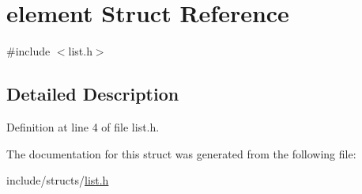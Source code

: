 \hypertarget{structelement}{\section{element \-Struct \-Reference}
\label{structelement}
}


{\ttfamily \#include $<$list.\-h$>$}



\subsection{\-Detailed \-Description}


\-Definition at line 4 of file list.\-h.



\-The documentation for this struct was generated from the following file\-:\begin{DoxyCompactItemize}
\item 
include/structs/\hyperlink{list_8h}{list.\-h}\end{DoxyCompactItemize}
